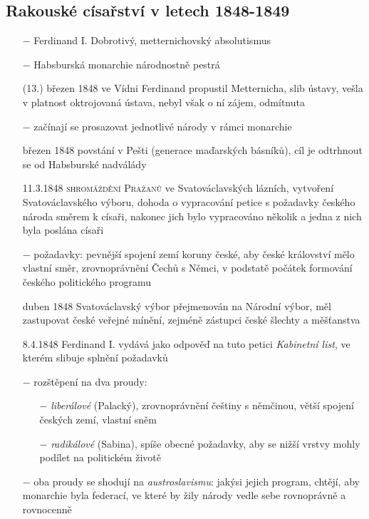 \documentclass{article}
\begin{document}
\subsection*{Rakouské císařství v letech 1848-1849}
\begin{itemize}
    \vspace{-0.5em}
    \setlength\itemsep{0.15em}
    \item[$-$] Ferdinand I. Dobrotivý, metternichovský absolutismus
    \item[$-$] Habsburská monarchie národnostně pestrá
    \item[(13.) březen 1848] ve Vídni Ferdinand propustil Metternicha, slib ústavy, vešla v platnost oktrojovaná ústava, nebyl však o ní zájem, odmítnuta
    \item[$-$] začínají se prosazovat jednotlivé národy v rámci monarchie
    \item[březen 1848] povstání v Pešti (generace maďarských básníků), cíl je odtrhnout se od Habsburské nadválády
    \item[11.3.1848] \textsc{shromáždění Pražanů} ve Svatováclavských lázních, vytvoření Svatováclavského výboru, dohoda o vypracování petice s požadavky českého národa směrem k císaři, nakonec jich bylo vypracováno několik a jedna z nich byla poslána císaři
    \item[$-$] požadavky: pevnější spojení zemí koruny české, aby české království mělo vlastní směr, zrovnoprávnění Čechů s Němci, v podstatě počátek formování českého politického programu
    \item[duben 1848] Svatováclavský výbor přejmenován  na Národní výbor, měl zastupovat české veřejné mínění, zejméně zástupci české šlechty a měšťanstva
    \item[8.4.1848] Ferdinand I. vydává jako odpověď na tuto petici \textit{Kabinetní list}, ve kterém slibuje splnění požadavků
    \item[$-$] rozštěpení na dva proudy:
    \begin{itemize}
        \vspace{-0.5em}
        \setlength\itemsep{0.15em}
        \item[$-$] \textit{liberálové} (Palacký), zrovnoprávnění češtiny s němčinou, větší spojení českých zemí, vlastní sněm
        \item[$-$] \textit{radikálové} (Sabina), spíše obecné požadavky, aby se nižší vrstvy mohly podílet na politickém životě
    \end{itemize}
    \item[$-$] oba proudy se shodují na \textit{austroslavismu}: jakýsi jejich program, chtějí, aby monarchie byla federací, ve které by žily národy vedle sebe rovnoprávně a rovnocenně

\end{itemize}
\end{document}
